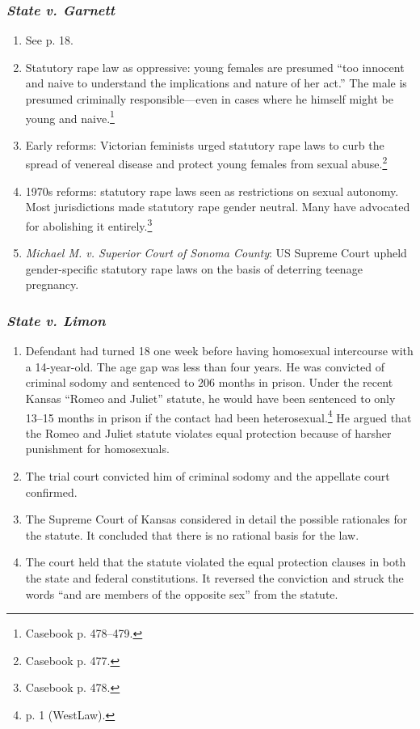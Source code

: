 \subsubsection{\emph{State v. Garnett}}

\begin{enumerate}
    \item See p. 18.
    \item Statutory rape law as oppressive: young females are presumed ``too innocent and naive to understand the implications and nature of her act.'' The male is presumed criminally responsible---even in cases where he himself might be young and naive.\footnote{Casebook p. 478--479.}
    \item Early reforms: Victorian feminists urged statutory rape laws to curb the spread of venereal disease and protect young females from sexual abuse.\footnote{Casebook p. 477.}
    \item 1970s reforms: statutory rape laws seen as restrictions on sexual autonomy. Most jurisdictions made statutory rape gender neutral. Many have advocated for abolishing it entirely.\footnote{Casebook p. 478.}
    \item \emph{Michael M. v. Superior Court of Sonoma County}: US Supreme Court upheld gender-specific statutory rape laws on the basis of deterring teenage pregnancy.
\end{enumerate}

\subsubsection{\emph{State v. Limon}}

\begin{enumerate}
    \item Defendant had turned 18 one week before having homosexual intercourse with a 14-year-old. The age gap was less than four years. He was convicted of criminal sodomy and sentenced to 206 months in prison. Under the recent Kansas ``Romeo and Juliet'' statute, he would have been sentenced to only 13--15 months in prison if the contact had been heterosexual.\footnote{p. 1 (WestLaw).} He argued that the Romeo and Juliet statute violates equal protection because of harsher punishment for homosexuals.
    \item The trial court convicted him of criminal sodomy and the appellate court confirmed.
    \item The Supreme Court of Kansas considered in detail the possible rationales for the statute. It concluded that there is no rational basis for the law.
    \item The court held that the statute violated the equal protection clauses in both the state and federal constitutions. It reversed the conviction and struck the words ``and are members of the opposite sex'' from the statute.
\end{enumerate}

